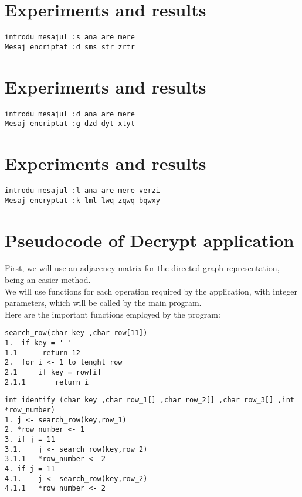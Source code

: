 \documentclass[14pt]{article}
\begin{document}
\newpage
\section*{Experiments and results}
\begin{lstlisting}
introdu mesajul :s ana are mere
Mesaj encriptat :d sms str zrtr

\end{lstlisting}
\section*{Experiments and results}
\begin{lstlisting}
introdu mesajul :d ana are mere
Mesaj encriptat :g dzd dyt xtyt

\end{lstlisting}
\section*{Experiments and results}
\begin{lstlisting}
introdu mesajul :l ana are mere verzi
Mesaj encryptat :k lml lwq zqwq bqwxy

\end{lstlisting}

\newpage
\section*{Pseudocode of Decrypt application}
First, we will use an adjacency matrix for the directed graph representation, being an easier method. 
\\
We will use functions for each operation required by the application, with integer parameters, which will be called by the main program.
\\
Here are the important functions employed by the program:
\begin{lstlisting}
search_row(char key ,char row[11])
1.	if key = ' '
1.1      return 12
2.	for i <- 1 to lenght row
2.1     if key = row[i]
2.1.1       return i
\end{lstlisting}
\begin{lstlisting}
int identify (char key ,char row_1[] ,char row_2[] ,char row_3[] ,int *row_number)
1. j <- search_row(key,row_1)
2. *row_number <- 1
3. if j = 11
3.1.    j <- search_row(key,row_2)
3.1.1   *row_number <- 2
4. if j = 11
4.1.    j <- search_row(key,row_2)
4.1.1   *row_number <- 2
\end{lstlisting}
\end{document}
